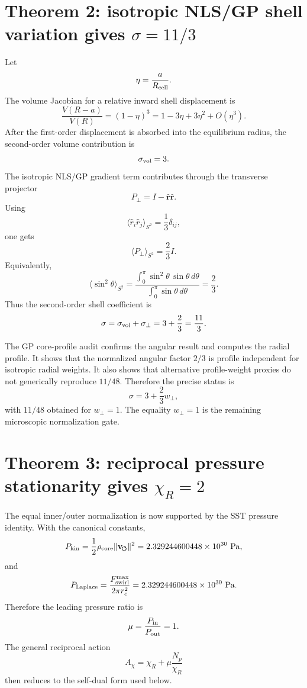 \documentclass[11pt]{article}
\begin{document}
\section{Theorem 2: isotropic NLS/GP shell variation gives \(\sigma=11/3\)}

Let
\[
  \eta=\frac{a}{R_{\rm cell}}.
\]
The volume Jacobian for a relative inward shell displacement is
\[
  \frac{V(R-a)}{V(R)}
  =
  (1-\eta)^3
  =
  1-3\eta+3\eta^2+O(\eta^3).
\]
After the first-order displacement is absorbed into the equilibrium radius, the
second-order volume contribution is
\[
  \sigma_{\rm vol}=3.
\]
The isotropic NLS/GP gradient term contributes through the transverse
projector
\[
  P_\perp=I-\hat{\mathbf r}\hat{\mathbf r}.
\]
Using
\[
  \langle \hat r_i\hat r_j\rangle_{S^2}
  =
  \frac13\delta_{ij},
\]
one gets
\[
  \langle P_\perp\rangle_{S^2}
  =
  \frac23 I.
\]
Equivalently,
\[
  \langle\sin^2\theta\rangle_{S^2}
  =
  \frac{\int_0^\pi \sin^2\theta\,\sin\theta\,d\theta}
       {\int_0^\pi \sin\theta\,d\theta}
  =
  \frac23.
\]
Thus the second-order shell coefficient is
\[
  \sigma
  =
  \sigma_{\rm vol}+\sigma_\perp
  =
  3+\frac23
  =
  \frac{11}{3}.
\]


The GP core-profile audit confirms the angular result and computes the radial
profile.  It shows that the normalized angular factor \(2/3\) is profile
independent for isotropic radial weights.  It also shows that alternative
profile-weight proxies do not generically reproduce \(11/48\).  Therefore the
precise status is
\[
  \sigma=3+\frac23w_\perp,
\]
with \(11/48\) obtained for \(w_\perp=1\).  The equality \(w_\perp=1\) is the
remaining microscopic normalization gate.

\section{Theorem 3: reciprocal pressure stationarity gives \(\chi_R=2\)}


The equal inner/outer normalization is now supported by the SST pressure
identity.  With the canonical constants,
\[
  P_{\rm kin}
  =
  \frac12\rho_{\rm core}
  \lVert\mathbf v_{\!\boldsymbol{\circlearrowleft}}\rVert^2
  =
  2.329244600448\times10^{30}\ {\rm Pa},
\]
and
\[
  P_{\rm Laplace}
  =
  \frac{F_{\rm swirl}^{\max}}{2\pi r_c^2}
  =
  2.329244600448\times10^{30}\ {\rm Pa}.
\]
Therefore the leading pressure ratio is
\[
  \mu=\frac{P_{\rm in}}{P_{\rm out}}=1.
\]
The general reciprocal action
\[
  A_\chi=\chi_R+\mu\frac{N_p}{\chi_R}
\]
then reduces to the self-dual form used below.
\end{document}
